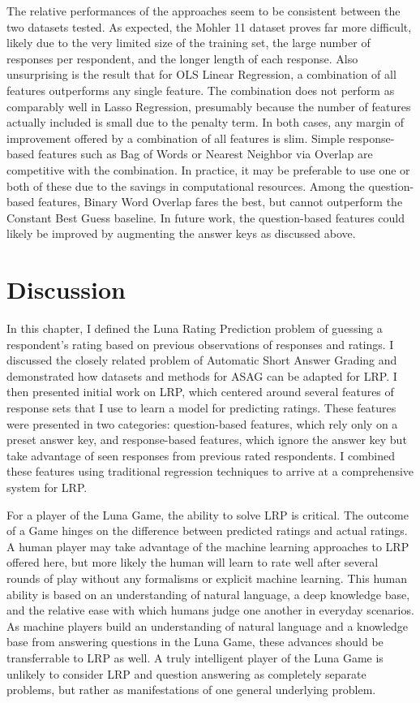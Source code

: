 The relative performances of the approaches seem to be consistent between the two datasets tested. As expected, the Mohler 11 dataset proves far more difficult, likely due to the very limited size of the training set, the large number of responses per respondent, and the longer length of each response. Also unsurprising is the result that for OLS Linear Regression, a combination of all features outperforms any single feature. The combination does not perform as comparably well in Lasso Regression, presumably because the number of features actually included is small due to the penalty term. In both cases, any margin of improvement offered by a combination of all features is slim. Simple response-based features such as Bag of Words or Nearest Neighbor via Overlap are competitive with the combination. In practice, it may be preferable to use one or both of these due to the savings in computational resources. Among the question-based features, Binary Word Overlap fares the best, but cannot outperform the Constant Best Guess baseline. In future work, the question-based features could likely be improved by augmenting the answer keys as discussed above.

\section{Discussion}
In this chapter, I defined the Luna Rating Prediction problem of guessing a respondent's rating based on previous observations of responses and ratings. I discussed the closely related problem of Automatic Short Answer Grading and demonstrated how datasets and methods for ASAG can be adapted for LRP. I then presented initial work on LRP, which centered around several features of response sets that I use to learn a model for predicting ratings. These features were presented in two categories: question-based features, which rely only on a preset answer key, and response-based features, which ignore the answer key but take advantage of seen responses from previous rated respondents. I combined these features using traditional regression techniques to arrive at a comprehensive system for LRP.

For a player of the Luna Game, the ability to solve LRP is critical. The outcome of a Game hinges on the difference between predicted ratings and actual ratings. A human player may take advantage of the machine learning approaches to LRP offered here, but more likely the human will learn to rate well after several rounds of play without any formalisms or explicit machine learning. This human ability is based on an understanding of natural language, a deep knowledge base, and the relative ease with which humans judge one another in everyday scenarios. As machine players build an understanding of natural language and a knowledge base from answering questions in the Luna Game, these advances should be transferrable to LRP as well. A truly intelligent player of the Luna Game is unlikely to consider LRP and question answering as completely separate problems, but rather as manifestations of one general underlying problem.

